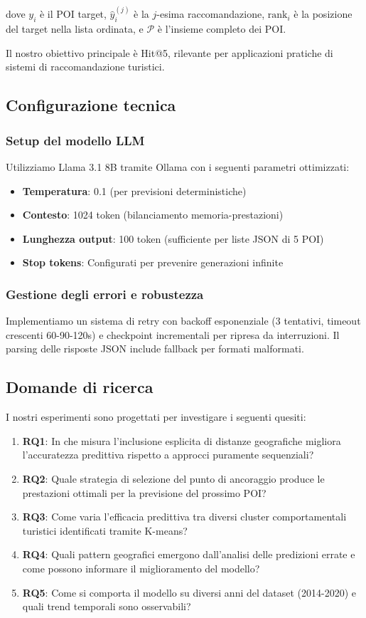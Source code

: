 dove $y_i$ è il POI target, $\hat{y}_i^{(j)}$ è la $j$-esima raccomandazione, $\text{rank}_i$ è la posizione del target nella lista ordinata, e $\mathcal{P}$ è l'insieme completo dei POI.

Il nostro obiettivo principale è Hit@5, rilevante per applicazioni pratiche di sistemi di raccomandazione turistici.

\subsection{Configurazione tecnica}

\subsubsection{Setup del modello LLM}
Utilizziamo Llama 3.1 8B tramite Ollama con i seguenti parametri ottimizzati:
\begin{itemize}
\item \textbf{Temperatura}: 0.1 (per previsioni deterministiche)
\item \textbf{Contesto}: 1024 token (bilanciamento memoria-prestazioni)
\item \textbf{Lunghezza output}: 100 token (sufficiente per liste JSON di 5 POI)
\item \textbf{Stop tokens}: Configurati per prevenire generazioni infinite
\end{itemize}

\subsubsection{Gestione degli errori e robustezza}
Implementiamo un sistema di retry con backoff esponenziale (3 tentativi, timeout crescenti 60-90-120s) e checkpoint incrementali per ripresa da interruzioni. Il parsing delle risposte JSON include fallback per formati malformati.

\subsection{Domande di ricerca}

I nostri esperimenti sono progettati per investigare i seguenti quesiti:

\begin{enumerate}
\item \textbf{RQ1}: In che misura l'inclusione esplicita di distanze geografiche migliora l'accuratezza predittiva rispetto a approcci puramente sequenziali?
\item \textbf{RQ2}: Quale strategia di selezione del punto di ancoraggio produce le prestazioni ottimali per la previsione del prossimo POI?
\item \textbf{RQ3}: Come varia l'efficacia predittiva tra diversi cluster comportamentali turistici identificati tramite K-means?
\item \textbf{RQ4}: Quali pattern geografici emergono dall'analisi delle predizioni errate e come possono informare il miglioramento del modello?
\item \textbf{RQ5}: Come si comporta il modello su diversi anni del dataset (2014-2020) e quali trend temporali sono osservabili?
\end{enumerate}

